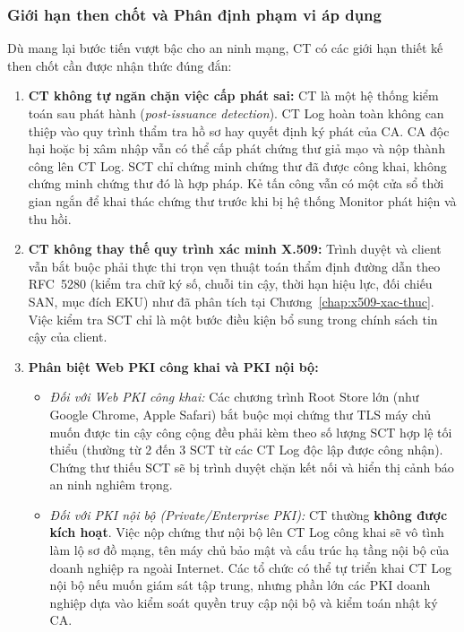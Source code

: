 \subsubsection{Giới hạn then chốt và Phân định phạm vi áp dụng}
Dù mang lại bước tiến vượt bậc cho an ninh mạng, CT có các giới hạn thiết kế then chốt cần được nhận thức đúng đắn:
\begin{enumerate}
    \item \textbf{CT không tự ngăn chặn việc cấp phát sai:} CT là một hệ thống kiểm toán sau phát hành (\textit{post-issuance detection}). CT Log hoàn toàn không can thiệp vào quy trình thẩm tra hồ sơ hay quyết định ký phát của CA. CA độc hại hoặc bị xâm nhập vẫn có thể cấp phát chứng thư giả mạo và nộp thành công lên CT Log. SCT chỉ chứng minh chứng thư đã được công khai, không chứng minh chứng thư đó là hợp pháp. Kẻ tấn công vẫn có một cửa sổ thời gian ngắn để khai thác chứng thư trước khi bị hệ thống Monitor phát hiện và thu hồi.
    \item \textbf{CT không thay thế quy trình xác minh X.509:} Trình duyệt và client vẫn bắt buộc phải thực thi trọn vẹn thuật toán thẩm định đường dẫn theo RFC~5280 (kiểm tra chữ ký số, chuỗi tin cậy, thời hạn hiệu lực, đối chiếu SAN, mục đích EKU) như đã phân tích tại Chương~\ref{chap:x509-xac-thuc}. Việc kiểm tra SCT chỉ là một bước điều kiện bổ sung trong chính sách tin cậy của client.
    \item \textbf{Phân biệt Web PKI công khai và PKI nội bộ:}
    \begin{itemize}
        \item \textit{Đối với Web PKI công khai:} Các chương trình Root Store lớn (như Google Chrome, Apple Safari) bắt buộc mọi chứng thư TLS máy chủ muốn được tin cậy công cộng đều phải kèm theo số lượng SCT hợp lệ tối thiểu (thường từ 2 đến 3 SCT từ các CT Log độc lập được công nhận). Chứng thư thiếu SCT sẽ bị trình duyệt chặn kết nối và hiển thị cảnh báo an ninh nghiêm trọng.
        \item \textit{Đối với PKI nội bộ (Private/Enterprise PKI):} CT thường \textbf{không được kích hoạt}. Việc nộp chứng thư nội bộ lên CT Log công khai sẽ vô tình làm lộ sơ đồ mạng, tên máy chủ bảo mật và cấu trúc hạ tầng nội bộ của doanh nghiệp ra ngoài Internet. Các tổ chức có thể tự triển khai CT Log nội bộ nếu muốn giám sát tập trung, nhưng phần lớn các PKI doanh nghiệp dựa vào kiểm soát quyền truy cập nội bộ và kiểm toán nhật ký CA.
    \end{itemize}
\end{enumerate}

